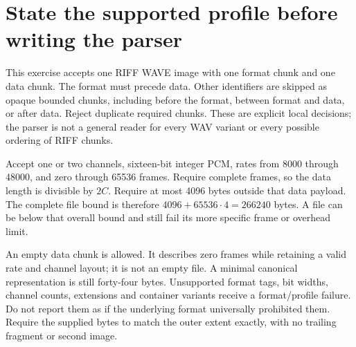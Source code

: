 \section{State the supported profile before writing the parser}
This exercise accepts one RIFF WAVE image with one format chunk and one data chunk.
The format must precede data. Other identifiers are skipped as opaque bounded chunks,
including before the format, between format and data, or after data. Reject duplicate
required chunks. These are explicit local decisions; the parser is not a general
reader for every WAV variant or every possible ordering of RIFF chunks.

Accept one or two channels, sixteen-bit integer PCM, rates from 8000 through 48000,
and zero through 65536 frames. Require complete frames, so the data length is divisible
by $2C$. Require at most 4096 bytes outside that data payload. The complete file bound
is therefore $4096+65536\cdot4=266240$ bytes. A file can be below that overall bound and
still fail its more specific frame or overhead limit.

An empty data chunk is allowed. It describes zero frames while retaining a valid rate
and channel layout; it is not an empty file. A minimal canonical representation is
still forty-four bytes. Unsupported format tags, bit widths, channel counts, extensions
and container variants receive a format/profile failure. Do not report them as if the
underlying format universally prohibited them. Require the supplied bytes to match the
outer extent exactly, with no trailing fragment or second image.
